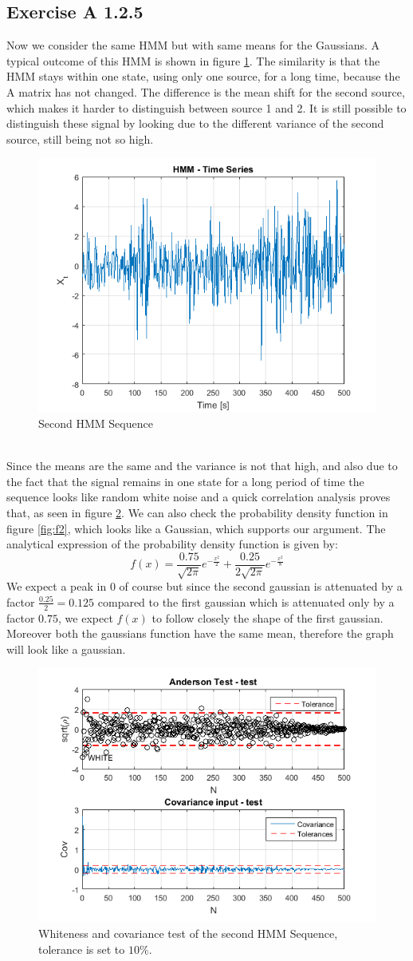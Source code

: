 \documentclass[10pt,a4paper,final]{article}
\begin{document}
\subsection{Exercise A 1.2.5}
Now we consider the same HMM but with same means for the Gaussians. A typical outcome of this HMM is shown in figure \ref{fig:A3}. The similarity is that the HMM stays within one state, using only one source, for a long time, because the A matrix has not changed. The difference is the mean shift for the second source, which makes it harder to distinguish between source 1 and 2. It is still possible to distinguish these signal by looking due to the different variance of the second source, still being not so high.
\begin{figure}[h]
		\centering
		\includegraphics[width=0.55\linewidth]{./images/A3.png}
		\caption{Second HMM Sequence}
		\label{fig:A3}	
\end{figure}\\
Since the means are the same and the variance is not that high, and also due to the fact that the signal remains in one state for a long period of time the sequence looks like random white noise and a quick correlation analysis proves that, as seen in figure \ref{fig:A4}. We can also check the probability density function in figure \ref{fig:f2}, which looks like a Gaussian, which supports our argument. The analytical expression of the probability density function is given by:
$$f(x) =  \frac{0.75}{\sqrt{2\pi}}e^{-\frac{x^2}{2}}+  \frac{0.25}{2\sqrt{2\pi}}e^{-\frac{x^2}{8}}$$
We expect a peak in $0$ of course but since the second gaussian is attenuated by a factor $\frac{0.25}{2}=0.125$ compared to the first gaussian which is attenuated only by a factor $0.75$, we expect $f(x)$ to follow closely the shape of the first gaussian. Moreover both the gaussians function have the same mean, therefore the graph will look like a gaussian. \newpage
\begin{figure}[h]
		\centering
		\includegraphics[width=0.55\linewidth]{./images/A4.png}
		\caption{Whiteness and covariance test of the second HMM Sequence, tolerance is set to $10\%$.}
		\label{fig:A4}	
\end{figure}
\end{document}
